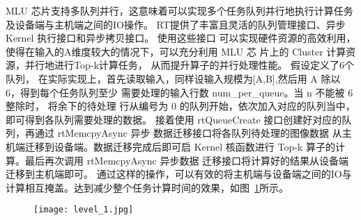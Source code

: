 MLU 芯片支持多队列并行，这意味着可以实现多个任务队列并行地执行计算任务及设备端与主机端之间的IO操作。
RT提供了丰富且灵活的队列管理接口、异步 Kernel 执行接口和异步拷贝接口。 使用这些接口
 可以实现硬件资源的高效利用，使得在输入的A维度较大的情况下，可以充分利用 MLU 芯
 片上的 Cluster 计算资源，并行地进行Top-k计算任务， 从而提升算子的并行处理性能。
 假设定义了6个队列，
在实际实现上，首先读取输入，同样设输入规模为[A,B],然后用 A 除以 6，得到每个任务队列至少
  需要处理的输入行数 num\_per\_queue。当 n 不能被 6 整除时， 将余下的待处理
  行从编号为 0 的队列开始，依次加入对应的队列当中，即可得到各队列需要处理的数据。
  接着使用 rtQueueCreate 接口创建好对应的队列，再通过 rtMemcpyAsync 异步
  数据迁移接口将各队列待处理的图像数据 从主机端迁移到设备端。数据迁移完成后即可启
   Kernel 核函数进行 Top-k 算子的计算。最后再次调用 rtMemcpyAsync 异步数据
   迁移接口将计算好的结果从设备端迁移到主机端即可。
通过这样的操作，可以有效的将主机端与设备端之间的IO与计算相互掩盖。达到减少整个任务计算时间的效果，如图~\ref{fig:level}所示。
\begin{figure}[ht]
    \centering
    \texttt{[image: level\_1.jpg]}
    \caption{}
    \label{fig:level}
\end{figure}










